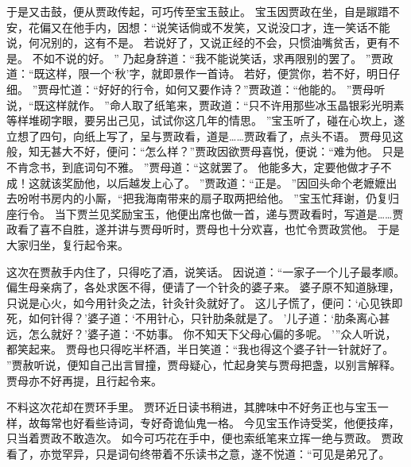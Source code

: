 \par
于是又击鼓，便从贾政传起，可巧传至宝玉鼓止。
宝玉因贾政在坐，自是踧踖不安，花偏又在他手内，因想：“说笑话倘或不发笑，又说没口才，连一笑话不能说，何况别的，这有不是。
若说好了，又说正经的不会，只惯油嘴贫舌，更有不是。
不如不说的好。
”
乃起身辞道：“我不能说笑话，求再限别的罢了。
”贾政道：“既这样，限一个‘秋’字，就即景作一首诗。
若好，便赏你，若不好，明日仔细。
”贾母忙道：“好好的行令，如何又要作诗？”贾政道：“他能的。
”贾母听说，“既这样就作。
”命人取了纸笔来，贾政道：“只不许用那些冰玉晶银彩光明素等样堆砌字眼，要另出己见，试试你这几年的情思。
”宝玉听了，碰在心坎上，遂立想了四句，向纸上写了，呈与贾政看，道是……贾政看了，点头不语。
贾母见这般，知无甚大不好，便问：“怎么样？”贾政因欲贾母喜悦，便说：“难为他。
只是不肯念书，到底词句不雅。
”贾母道：“这就罢了。
他能多大，定要他做才子不成！这就该奖励他，以后越发上心了。
”贾政道：“正是。
”因回头命个老嬷嬷出去吩咐书房内的小厮，“把我海南带来的扇子取两把给他。
”宝玉忙拜谢，仍复归座行令。
当下贾兰见奖励宝玉，他便出席也做一首，递与贾政看时，写道是……贾政看了喜不自胜，遂并讲与贾母听时，贾母也十分欢喜，也忙令贾政赏他。
于是大家归坐，复行起令来。
\par
这次在贾赦手内住了，只得吃了酒，说笑话。
因说道：“一家子一个儿子最孝顺。
偏生母亲病了，各处求医不得，便请了一个针灸的婆子来。
婆子原不知道脉理，只说是心火，如今用针灸之法，针灸针灸就好了。
这儿子慌了，便问：‘心见铁即死，如何针得？’婆子道：‘不用针心，只针肋条就是了。
’儿子道：‘肋条离心甚远，怎么就好？’婆子道：‘不妨事。
你不知天下父母心偏的多呢。
’”众人听说，都笑起来。
贾母也只得吃半杯酒，半日笑道：“我也得这个婆子针一针就好了。
”贾赦听说，便知自己出言冒撞，贾母疑心，忙起身笑与贾母把盏，以别言解释。
贾母亦不好再提，且行起令来。
\par
不料这次花却在贾环手里。
贾环近日读书稍进，其脾味中不好务正也与宝玉一样，故每常也好看些诗词，专好奇诡仙鬼一格。
今见宝玉作诗受奖，他便技痒，只当着贾政不敢造次。
如今可巧花在手中，便也索纸笔来立挥一绝与贾政。
贾政看了，亦觉罕异，只是词句终带着不乐读书之意，遂不悦道：“可见是弟兄了。
